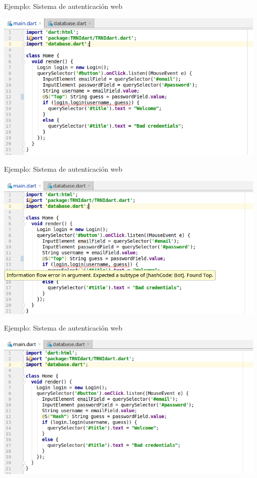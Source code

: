 \documentclass[aspectratio=169,10pt]{beamer}
\begin{document}
\begin{frame}[fragile]{Ejemplo: Sistema de autenticación web}
	\begin{center}
		\includegraphics[width=1.0\textwidth]{images/html2.png}
	\end{center}
\end{frame}

\begin{frame}[fragile]{Ejemplo: Sistema de autenticación web}
	\begin{center}
		\includegraphics[width=1.0\textwidth]{images/html3.png}
	\end{center}
\end{frame}

\begin{frame}[fragile]{Ejemplo: Sistema de autenticación web}
	\begin{center}
		\includegraphics[width=1.0\textwidth]{images/html4.png}
	\end{center}
\end{frame}
\end{document}
